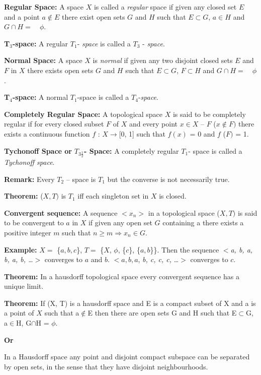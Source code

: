 \documentclass[12pt]{amsart}
\begin{document}
\textbf{Regular Space:} A space $X$ is called a \textit{regular} space if given any closed set 
$E$ and a point $a\notin E$ there exist open sets $G$ and $H$ such that $E\subset G$, 
$a\in H$ and $G\cap H = \quad \phi $.

\textbf{T}$_{3}$\textbf{-space:} A regular $T_{1}$- \textit{space} is called a $T_{3}$ - 
\textit{space}.

\textbf{Normal Space:} A space $X$ is \textit{normal} if given any two disjoint closed sets 
$E$ and $F$ in $X$ there exists open sets $G$ and $H$ such that $E\subset G$, $F\subset H$ and 
$G\cap H = \quad \phi $.

\textbf{T}$_{4}$\textbf{-space:} A normal $T_{1}$-space is called a 
$T_{4}$-\textit{space}.

\textbf{Completely Regular Space: }A topological space $X$ is said to be 
completely regular if for every closed subset $F$ of $X$ and every point $x \in X$ -- 
$F$ ($x\notin F)$ there exists a continuous function $f$ : $X \to $[0, 1] such that $f (x)$ 
= 0 and $f$ ($F)$ = 1.

\textbf{Tychonoff Space or }$T_{3\frac{1}{2}} $\textbf{- Space: }A 
completely regular $T_{1}$- space is called a \textit{Tychonoff space}.

\textbf{Remark:} Every $T_{2}$ -- space is $T_{1}$ but the converse is not 
necessarily true.

\textbf{Theorem:} ($X, T )$ is $T_{1}$ iff each singleton set in $X$ is closed.

\textbf{Convergent sequence:} A sequence $<x_{n}>$ in a topological space 
($X, T)$ is said to be convergent to $a$ in $X$ if given any open set $G$ containing a 
there exists a positive integer $m$ such that $n\geqslant m\Rightarrow 
x_{n}\in G$.

\textbf{Example:} $X =$ {\{}$a, b, c${\}}, $T =$ {\{}$X$, $\phi $, {\{}$c${\}}, {\{}$a, b${\}}{\}}. Then 
the sequence $<$\textit{a, b, a, b, a, b, {\ldots}}$>$ converges to $a$ and $b$. $<a, b, a$, \textit{b, c, c, c,} {\ldots}$>$ converges to $c$.

\textbf{Theorem:} In a hausdorff topological space every convergent sequence 
has a unique limit.

\textbf{Theorem:} If (X, T) is a hausdorff space and E is a compact subset 
of X and a is a point of $X$ such that a$\notin $E then there are open sets G 
and H such that E$\subset $G, a$\in $H, G$\cap $H = $\phi $.

\textbf{Or}

In a Hausdorff space any point and disjoint compact subspace can be 
separated by open sets, in the sense that they have disjoint neighbourhoods.
\end{document}

